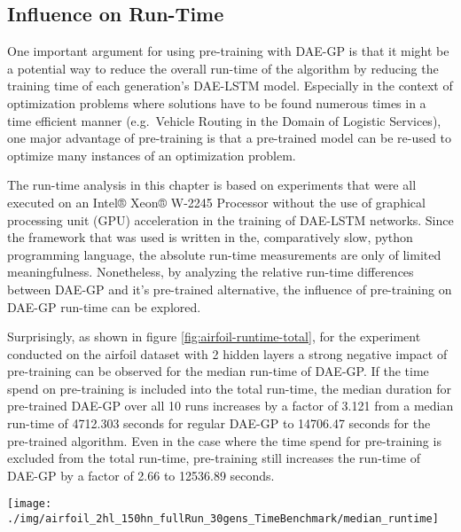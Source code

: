 \documentclass[
  11pt,
]{article}
\let\origfigure\figure
\let\endorigfigure\endfigure
\renewenvironment{figure}[1][2] {
    \expandafter\origfigure\expandafter[H]
} {
    \endorigfigure
}
\begin{document}
\hypertarget{influence-on-run-time}{%
\subsection{Influence on Run-Time}\label{influence-on-run-time}}

One important argument for using pre-training with DAE-GP is that it might be a potential way to reduce the overall run-time of the algorithm by reducing the training time of each generation's DAE-LSTM model. Especially in the context of optimization problems where solutions have to be found numerous times in a time efficient manner (e.g.~Vehicle Routing in the Domain of Logistic Services), one major advantage of pre-training is that a pre-trained model can be re-used to optimize many instances of an optimization problem.

The run-time analysis in this chapter is based on experiments that were all executed on an Intel® Xeon® W-2245 Processor without the use of graphical processing unit (GPU) acceleration in the training of DAE-LSTM networks. Since the framework that was used is written in the, comparatively slow, python programming language, the absolute run-time measurements are only of limited meaningfulness. Nonetheless, by analyzing the relative run-time differences between DAE-GP and it's pre-trained alternative, the influence of pre-training on DAE-GP run-time can be explored.

Surprisingly, as shown in figure \ref{fig:airfoil-runtime-total}, for the experiment conducted on the airfoil dataset with 2 hidden layers a strong negative impact of pre-training can be observed for the median run-time of DAE-GP. If the time spend on pre-training is included into the total run-time, the median duration for pre-trained DAE-GP over all 10 runs increases by a factor of 3.121 from a median run-time of 4712.303 seconds for regular DAE-GP to 14706.47 seconds for the pre-trained algorithm. Even in the case where the time spend for pre-training is excluded from the total run-time, pre-training still increases the run-time of DAE-GP by a factor of 2.66 to 12536.89 seconds.

\begin{figure}[c]

{\centering \texttt{[image: ./img/airfoil\_2hl\_150hn\_fullRun\_30gens\_TimeBenchmark/median\_runtime]} 

}

\caption{Median Runtime - Airfoil}\label{fig:airfoil-runtime-total}
\end{figure}
\end{document}
